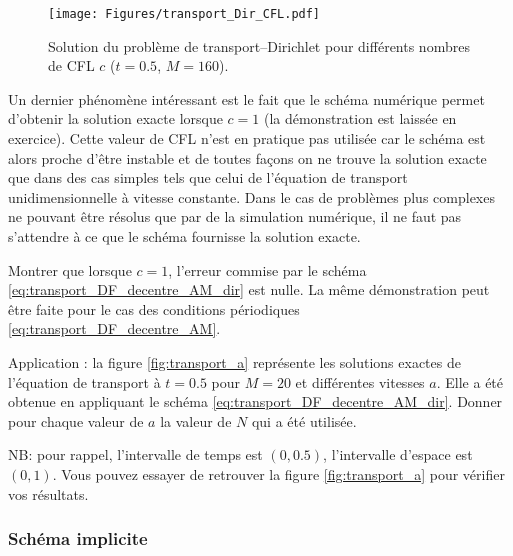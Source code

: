 \documentclass[12pt,a4paper,twoside]{article}
\begin{document}
\begin{figure}[h]
  \centering
  \texttt{[image: Figures/transport\_Dir\_CFL.pdf]}
  \caption{Solution du probl\`eme de transport--Dirichlet pour diff\'erents nombres de CFL $c$
    ($t=0.5$, $M=160$).}
  \label{fig:trans_CFL}
\end{figure}

Un dernier ph\'enom\`ene int\'eressant est le fait que le sch\'ema num\'erique permet
d'obtenir la solution exacte lorsque $c=1$ (la d\'emonstration est laiss\'ee en exercice).
Cette valeur de CFL n'est en pratique pas utilis\'ee car le sch\'ema est alors proche d'\^etre
instable et de toutes fa\c{c}ons on ne trouve la solution exacte que dans des cas simples
tels que celui de l'\'equation de transport unidimensionnelle \`a vitesse constante.
Dans le cas de probl\`emes plus complexes ne pouvant \^etre r\'esolus que par de la simulation
num\'erique, il ne faut pas s'attendre \`a ce que le sch\'ema fournisse la solution exacte.

\begin{exercise}
  Montrer que lorsque $c=1$, l'erreur commise par le sch\'ema 
  \eqref{eq:transport_DF_decentre_AM_dir} est nulle.
  La m\^eme d\'emonstration peut \^etre faite pour le cas des conditions p\'eriodiques
  \eqref{eq:transport_DF_decentre_AM}.

  Application : 
  la figure \ref{fig:transport_a} repr\'esente les solutions exactes de l'\'equation de transport
  \`a $t=0.5$ pour $M=20$ et diff\'erentes vitesses $a$.
  Elle a \'et\'e obtenue en appliquant le sch\'ema 
  \eqref{eq:transport_DF_decentre_AM_dir}. Donner pour chaque valeur de $a$ la valeur de $N$
  qui a \'et\'e utilis\'ee.

  NB: pour rappel, l'intervalle de temps est $(0,0.5)$, l'intervalle d'espace est $(0,1)$.
  Vous pouvez essayer de retrouver la figure \ref{fig:transport_a}
  pour v\'erifier vos r\'esultats.
\end{exercise}


\subsubsection{Sch\'ema implicite}
\end{document}
